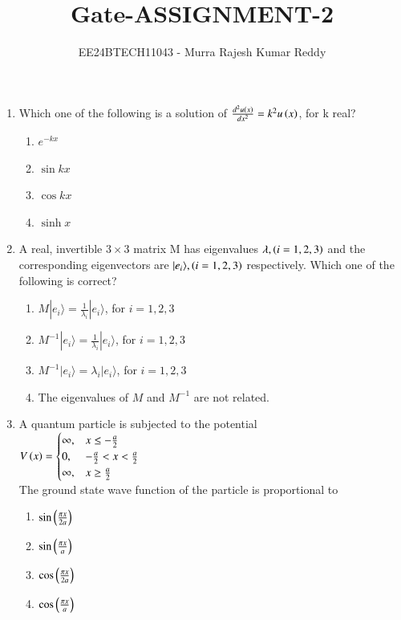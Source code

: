 \documentclass[journal,12pt,onecolumn,article]{IEEEtran}
\theoremstyle{remark}
\begin{document}

\vspace{3cm}
\title{Gate-ASSIGNMENT-2}
\author{EE24BTECH11043 - Murra Rajesh Kumar Reddy}
\maketitle
\bigskip
\begin{enumerate}
	\item Which one of the following is a solution of $\frac{d^2 u\left(x\right)}{dx^2}=k^2u\left(x\right)$, for k real?
		\begin{enumerate}
			\item $e^{-kx}$
			\item $\sin {kx}$
			\item $\cos {kx}$
			\item $\sinh {x}$
		\end{enumerate}
	\item A real, invertible $3\times 3$ matrix M has eigenvalues $\lambda,\left(i=1,2,3\right)$ and the corresponding eigenvectors are $|e_i\rangle , \left(i=1,2,3\right)$ respectively. Which one of the following is correct?
		\begin{enumerate}
			\item $M |e_i \rangle = \frac{1}{\lambda_i}|e_i\rangle$, for $i=1,2,3$
			\item $M^{-1}|e_i \rangle = \frac{1}{\lambda_i}|e_i\rangle$, for $i=1,2,3$
			\item $M^{-1}|e_i \rangle = \lambda_i|e_i\rangle$, for $i=1,2,3$
			\item The eigenvalues of $M$ and $M^{-1}$ are not related.
		\end{enumerate}
	\item A quantum particle is subjected to the potential \\
		$ V\left(x\right) =
		\begin{cases}
			\infty, & x\le -\frac{a}{2} \\
			0, & -\frac{a}{2} < x < \frac{a}{2} \\
			\infty, & x\ge \frac{a}{2}
		\end{cases}$ \\
		The ground state wave function of the particle is proportional to
		\begin{enumerate}
			\item $\sin{\ensuremath{\left(\frac{\pi x}{2a}\right)}}$
			\item $\sin{\ensuremath{\left(\frac{\pi x}{a}\right)}}$
			\item $\cos{\ensuremath{\left(\frac{\pi x}{2a}\right)}}$
			\item $\cos{\ensuremath{\left(\frac{\pi x}{a}\right)}}$

\end{enumerate}
\end{enumerate}
\end{document}
